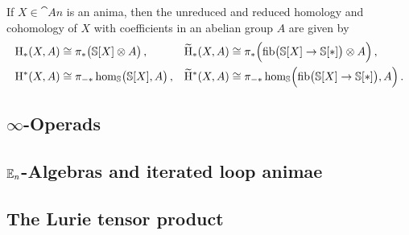 \begin{cor}\label{cor:Homology}
	If $X\in\cat{An}$ is an anima, then the unreduced and reduced homology and cohomology of $X$ with coefficients in an abelian group $A$ are given by
	\begin{align*}
		\mathrm{H}_*(X,A)&\cong \pi_*\bigl(\mathbb{S}[X]\otimes A\bigr)\,,& \widetilde{\mathrm{H}}_*(X,A)&\cong \pi_*\Bigl(\operatorname{fib}\bigl(\mathbb{S}[X]\rightarrow \mathbb{S}[*]\bigr)\otimes A\Bigr)\,,\\
		\mathrm{H}^*(X,A)&\cong \pi_{-*}\hom_{\mathbb{S}}\bigl(\mathbb{S}[X], A\bigr)\,,& \widetilde{\mathrm{H}}^*(X,A)&\cong \pi_{-*}\hom_{\mathbb{S}}\Bigl(\operatorname{fib}\bigl(\mathbb{S}[X]\rightarrow \mathbb{S}[*]\bigr), A\Bigr)\,.
	\end{align*}
\end{cor}

\newpage

\subsection{\texorpdfstring{$\infty$}{Infinity}-Operads}\label{subsec:InfinityOperads}

\subsection{\texorpdfstring{$\mathbb{E}_n$}{En}-Algebras and iterated loop animae}\label{subsec:EnAlgebras}

\subsection{The Lurie tensor product}\label{subsec:LurieTensorProduct}

\postsectionappendix